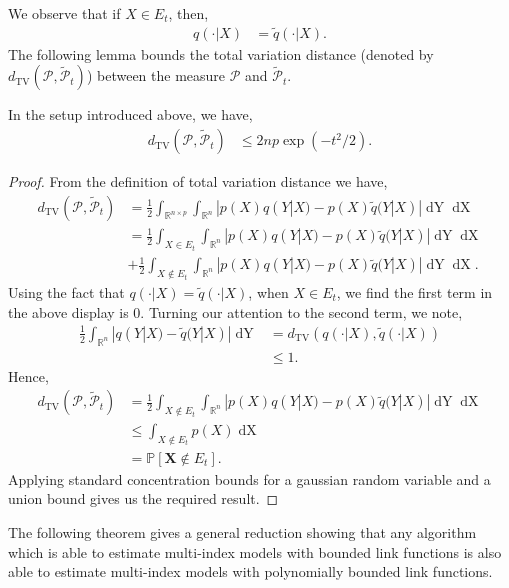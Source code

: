 \documentclass[final,12pt]{colt2018} %
\newcommand{\Prob}{\mathbb{P}}
\newcommand{\R}{\mathbb{R}}
\renewcommand\v[1]{{\ensuremath{\boldsymbol{#1}}}}
\begin{document}
We observe that if $X \in E_t$, then,
\begin{align*}
    q(\cdot | X) & = \tilde{q}(\cdot | X).
\end{align*}
The following lemma bounds the total variation distance (denoted by $d_{\text{TV}}(\mathcal{P},\mathcal{\tilde{P}}_t)$) between the measure $\mathcal{P}$ and $\mathcal{\tilde{P}}_t$.
\begin{lemma} In the setup introduced above, we have,
\begin{align*}
    d_{\text{TV}}(\mathcal{P},\mathcal{\tilde{P}}_t) & \leq 2np \exp(-t^2/2).
\end{align*}
\label{tv_lemma}
\end{lemma}
\begin{proof}
From the definition of total variation distance we have,
\begin{align*}
    d_{\text{TV}}(\mathcal{P},\mathcal{\tilde{P}}_t) & = \frac{1}{2} \int_{\R^{n \times p}} \int_{\R^n} |p(X)q(Y|X) - p(X)\tilde{q}(Y|X)| \mathop{dY} \mathop{dX} \\
    & = \frac{1}{2} \int_{X \in E_t} \int_{\R^n} |p(X)q(Y|X) - p(X)\tilde{q}(Y|X)| \mathop{dY} \mathop{dX} \\&+ \frac{1}{2} \int_{X \not \in E_t} \int_{\R^n} |p(X)q(Y|X) - p(X)\tilde{q}(Y|X)| \mathop{dY} \mathop{dX}. 
\end{align*}
Using the fact that $q(\cdot|X) = \tilde{q}(\cdot|X)$, when $X \in E_t$, we find the first term in the above display is 0. Turning our attention to the second term, we note, 
\begin{align*}
    \frac{1}{2}\int_{\R^n} |q(Y|X) - \tilde{q}(Y|X)| \mathop{dY} & = d_{\text{TV}}(q(\cdot|X), \tilde{q}(\cdot|X)) \\
    & \leq 1.
\end{align*}
Hence,
\begin{align*}
    d_{\text{TV}}(\mathcal{P},\mathcal{\tilde{P}}_t) & =\frac{1}{2} \int_{X \not \in E_t} \int_{\R^n} |p(X)q(Y|X) - p(X)\tilde{q}(Y|X)| \mathop{dY} \mathop{dX} \\
    & \leq  \int_{X \not \in E_t} p(X) \mathop{dX} \\
    & = \Prob[\v X \not \in E_t].
\end{align*}
Applying standard concentration bounds for a gaussian random variable and a union bound gives us the required result.
\end{proof}
The following theorem gives a general reduction showing that any algorithm which is able to estimate multi-index models with bounded link functions is also able to estimate multi-index models with polynomially bounded link functions. 
\end{document}
